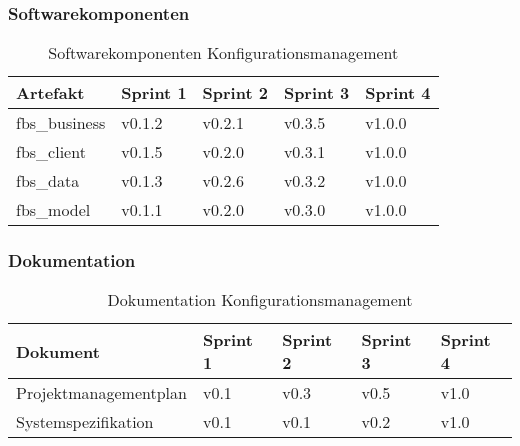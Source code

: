 \subsubsection{Softwarekomponenten}
\begin{table}[H]
\begin{tabular}{ | p{} | p{} | p{} | p{} | p{} | }
\hline \rowcolor{gray!50}
	\textbf{Artefakt} 		 &
	\textbf{Sprint 1}	 	 &
	\textbf{Sprint 2}	 	 &
	\textbf{Sprint 3}		 &
	\textbf{Sprint 4}
	\\	\hline
	fbs\_business 	&
	v0.1.2 			&
	v0.2.1 			&
	v0.3.5 			&
	v1.0.0
	\\  \hline	%
	fbs\_client 		&
	v0.1.5 			&
	v0.2.0 			&
	v0.3.1 			&
	v1.0.0
	\\  \hline	%
	fbs\_data 		&
	v0.1.3 			&
	v0.2.6 			&
	v0.3.2 			&
	v1.0.0
	\\  \hline	%
	fbs\_model 		&
	v0.1.1 			&
	v0.2.0 			&
	v0.3.0 			&
	v1.0.0
	\\  \hline	%
\end{tabular}
\label{tab:config_sw}
\caption{Softwarekomponenten Konfigurationsmanagement}
\end{table}

\subsubsection{Dokumentation}
\begin{table}[H]
\begin{tabular}{ | p{} | p{} | p{} | p{} | p{} | }
\hline \rowcolor{gray!50}
	\textbf{Dokument} 		&
	\textbf{Sprint 1}	 	&
	\textbf{Sprint 2}	 	&
	\textbf{Sprint 3}		&
	\textbf{Sprint 4}
	\\	\hline
	Projektmanagementplan 	&
	v0.1 					&
	v0.3 					&
	v0.5 					&
	v1.0
	\\  \hline	%
	Systemspezifikation 	&
	v0.1 					&
	v0.1 					&
	v0.2 					&
	v1.0
	\\  \hline	%
\end{tabular}
\label{tab:config_dok}
\caption{Dokumentation Konfigurationsmanagement}
\end{table}
